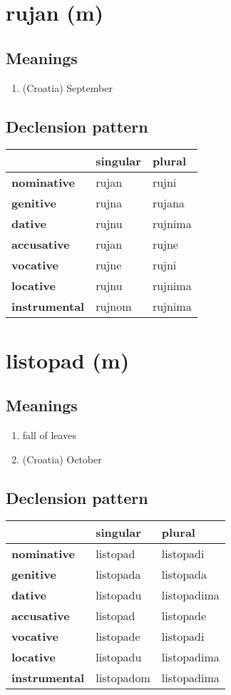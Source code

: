 \filbreak
\section{rujan (m)}
\subsection*{Meanings}
\begin{enumerate}
\item (Croatia) September
\end{enumerate}
\subsection*{Declension pattern}
\begin{tabularx}{\linewidth}{Xll}
\toprule
{} & singular &   plural \\
\midrule
\textbf{nominative  } &    rujan &    rujni \\
\textbf{genitive    } &    rujna &   rujana \\
\textbf{dative      } &    rujnu &  rujnima \\
\textbf{accusative  } &    rujan &    rujne \\
\textbf{vocative    } &    rujne &    rujni \\
\textbf{locative    } &    rujnu &  rujnima \\
\textbf{instrumental} &   rujnom &  rujnima \\
\bottomrule
\end{tabularx}

\filbreak
\section{listopad (m)}
\subsection*{Meanings}
\begin{enumerate}
\item fall of leaves
\item (Croatia) October
\end{enumerate}
\subsection*{Declension pattern}
\begin{tabularx}{\linewidth}{Xll}
\toprule
{} &    singular &       plural \\
\midrule
\textbf{nominative  } &    listopad &    listopadi \\
\textbf{genitive    } &   listopada &    listopada \\
\textbf{dative      } &   listopadu &  listopadima \\
\textbf{accusative  } &    listopad &    listopade \\
\textbf{vocative    } &   listopade &    listopadi \\
\textbf{locative    } &   listopadu &  listopadima \\
\textbf{instrumental} &  listopadom &  listopadima \\
\bottomrule
\end{tabularx}

